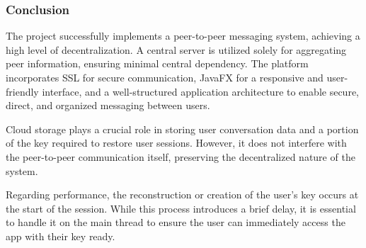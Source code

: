 \documentclass[a4paper,openright,twoside,11pt]{report}
\begin{document}
\subsubsection{Conclusion}
The project successfully implements a peer-to-peer messaging system, achieving a high level of decentralization. A central server is utilized solely for aggregating peer information, ensuring minimal central dependency. The platform incorporates SSL for secure communication, JavaFX for a responsive and user-friendly interface, and a well-structured application architecture to enable secure, direct, and organized messaging between users.

Cloud storage plays a crucial role in storing user conversation data and a portion of the key required to restore user sessions. However, it does not interfere with the peer-to-peer communication itself, preserving the decentralized nature of the system.

Regarding performance, the reconstruction or creation of the user's key occurs at the start of the session. While this process introduces a brief delay, it is essential to handle it on the main thread to ensure the user can immediately access the app with their key ready.
\end{document}
